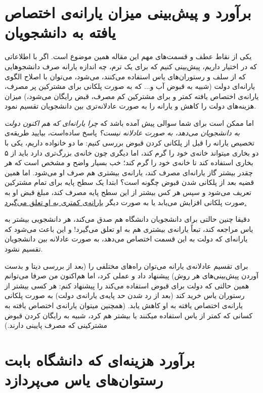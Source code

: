 \documentclass{article}
\begin{document}
	\section{برآورد و پیش‌بینی میزان یارانه‌ی اختصاص یافته‌ به دانشجویان}
		یکی از نقاط عطف و قسمت‌های مهم این مقاله‌ همین موضوع است. اگر با اطلاعاتی که در اختیار داریم، پیش‌بینی کنیم که برای یک ترم، چه اندازه یارانه‌ صرف دانشجو‌هایی که از سلف و رستوران‌های یاس استفاده می‌کنند، می‌شود، می‌توان با اصلاح الگوی یارانه‌ای دولت (شبیه به قبوض آب و... که به صورت پلکانی برای مشترکین پر مصرف، یارانه‌ی اختصاص یافته کمتر و برای مشترکین کم مصرف، قبض رایگان می‌شود،) میزان‌ هزینه‌‌های دولت را کاهش و یارانه را به صورت عادلانه‌تری بین دانشجویان تقسیم نمود.
		
		
		اما ممکن است برای شما سوالی پیش  آمده باشد که \textit{چرا یارانه‌ای که هم اکنون دولت به دانشجویان می‌دهد، به صورت عادلانه نیست؟}
		پاسخ ساده‌است، بیایید طریقه‌ی تخصیص یارانه را قبل از پلکانی کردن قبوض بررسی کنیم: ما دو خانواده داریم، یکی با دو بخاری میتواند خانه‌ی خود را گرم کند، اما دیگری چون خانه‌ی بزرگ‌تری دارد باید از ۵ بخاری استفاده کند تا خانه‌ی خود را گرم کند؛ خب بسیار واضح و مشخص است که هر چقدر بیشتر گاز یارانه‌ای مصرف کند، یارانه‌ی بیشتری هم صرف او می‌شود. اما همین قضیه بعد از پلکانی شدن قبوض چگونه است؟ ابتدا یک سطح پایه‌ برای تمام مشترکین تعریف می‌شود و سپس هر کس بیشتر از این سطح پایه مصرف کند، مبلغ قبض او به صورت پلکانی افزایش می‌یابد یا به صورت دیگر \underline{یارانه‌ی کمتری به او تعلق می‌گیرد.} 
		
		دقیقا چنین حالتی برای دانشجویان دانشگاه هم صدق می‌کند، هر دانشجویی بیشتر به یاس مراجعه کند، تبعاً یارانه‌ی بیشتری هم به او تعلق می‌گیرد! و این باعث می‌شود که یارانه‌ای که دولت به این قسمت اختصاص می‌دهد، به صورت عادلانه بین دانشجویان تقسیم نشود. 
		
		برای تقسیم عادلانه‌ی یارانه‌ می‌توان راه‌های مختلفی را (بعد از بررسی دیتا و بدست‌ آوردن پیش‌بینی‌های هر روش) پیشنهاد داد و عملی کرد، اما هم‌اکنون من صرفا می‌توانم همین حالتی که دولت برای قبوض استفاده می‌کند را پیشنهاد کنم:‌ هر کسی بیشتر از رستوران یاس خرید کند (بعد از رد شدن حد پایه‌ی یارانه‌ی دولت) به صورت پلکانی یارانه‌ی اختصاص یافته به او کاهش یابد. (همچنین میتوان یارانه‌ی اختصاص یافته‌ به کسانی که کمتر از یاس استفاده میکنند یا بیشتر هم کرد، شبیه به رایگان کردن قبوض مشترکینی که مصرف پایینی دارند.)
	
	\section{برآورد هزینه‌ای که دانشگاه بابت رستوان‌های یاس می‌پردازد}
\end{document}
